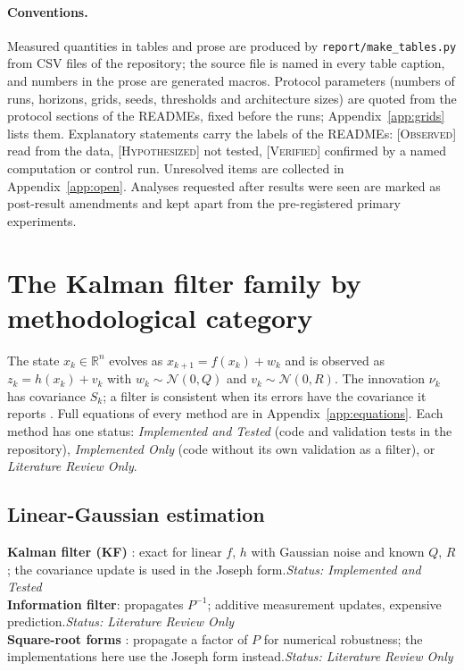 \documentclass[11pt,a4paper]{article}
\newcommand{\obs}{\textsc{[Observed]}}
\newcommand{\hyp}{\textsc{[Hypothesized]}}
\newcommand{\ver}{\textsc{[Verified]}}
\newcommand{\status}[1]{\hfill\textit{Status: #1}}
\begin{document}
\paragraph{Conventions.} Measured quantities in tables and prose are produced by
\texttt{report/make\_tables.py} from CSV files of the repository; the source file is named in every
table caption, and numbers in the prose are generated macros. Protocol parameters (numbers of runs,
horizons, grids, seeds, thresholds and architecture sizes) are quoted from the protocol sections of
the READMEs, fixed before the runs; Appendix~\ref{app:grids} lists them. Explanatory statements
carry the labels of the READMEs: \obs{} read from the data, \hyp{} not tested, \ver{} confirmed by a
named computation or control run. Unresolved items are collected in Appendix~\ref{app:open}.
Analyses requested after results were seen are marked as post-result amendments and kept apart
from the pre-registered primary experiments.

\section{The Kalman filter family by methodological category}\label{sec:family}

The state $x_k\in\mathbb R^n$ evolves as $x_{k+1}=f(x_k)+w_k$ and is observed as $z_k=h(x_k)+v_k$
with $w_k\sim\mathcal N(0,Q)$ and $v_k\sim\mathcal N(0,R)$. The innovation $\nu_k$ has covariance
$S_k$; a filter is consistent when its errors have the covariance it reports
\citep{barshalom2001,sarkka2013}. Full equations of every method are in Appendix~\ref{app:equations}.
Each method has one status: \emph{Implemented and Tested} (code and validation tests in the
repository), \emph{Implemented Only} (code without its own validation as a filter), or
\emph{Literature Review Only}.

\subsection{Linear-Gaussian estimation}
\textbf{Kalman filter (KF)} \citep{kalman1960}: exact for linear $f$, $h$ with Gaussian noise and
known $Q$, $R$; the covariance update is used in the Joseph form.\status{Implemented and Tested}\\
\textbf{Information filter}: propagates $P^{-1}$; additive measurement updates, expensive
prediction.\status{Literature Review Only}\\
\textbf{Square-root forms} \citep{bierman1977}: propagate a factor of $P$ for numerical robustness;
the implementations here use the Joseph form instead.\status{Literature Review Only}
\end{document}
